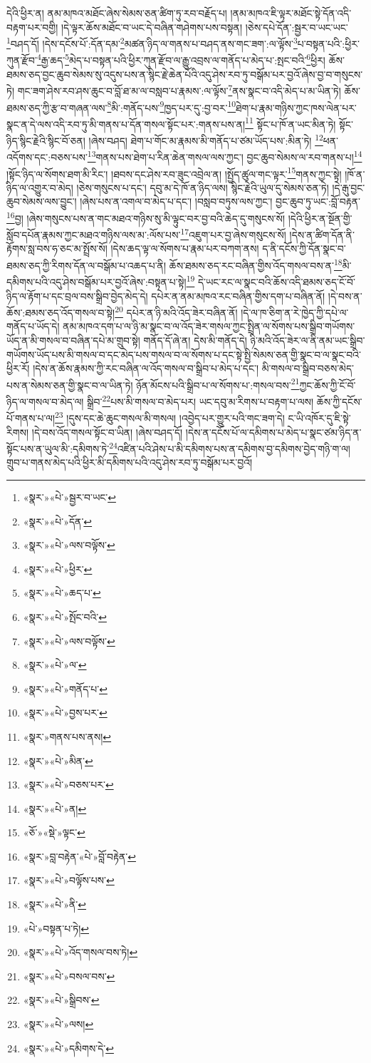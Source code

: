 དེའི་ཕྱིར་ན། ནམ་མཁའ་མཐོང་ཞེས་སེམས་ཅན་ཚིག་ཏུ་རབ་བརྗོད་པ། །ནམ་མཁའ་ཇི་ལྟར་མཐོང་སྟེ་དོན་འདི་བརྟག་པར་བགྱི། །དེ་ལྟར་ཆོས་མཐོང་བ་ཡང་དེ་བཞིན་གཤེགས་པས་བསྟན། །ཅེས་དཔེ་དོན་:སྦྱར་བ་ཡང་ཡང་\footnote{«སྣར་»«པེ་»སྦྱར་བ་ཡང་}བཤད་དོ། །དེས་དངོས་པོ་:དོན་དམ་\footnote{«སྣར་»«པེ་»དོན་}མཚན་ཉིད་ལ་གནས་པ་བཤད་ནས་གང་ཟག་:ལ་ལྟོས་\footnote{«སྣར་»«པེ་»ལས་བལྟོས་}པ་བསྟན་པའི་:ཕྱིར་ཀུན་རྫོབ་\footnote{«སྣར་»«པེ་»ཕྱིར་}རྒྱ་ཆད་\footnote{«སྣར་»«པེ་»ཆད་པ་}མེད་པ་བསྟན་པའི་ཕྱིར་ཀུན་རྫོབ་ལ་རྒྱུ་འབྲས་ལ་གནོད་པ་མེད་པ་:སྤང་བའི་\footnote{«སྣར་»«པེ་»སྤོང་བའི་}ཕྱིར། ཆོས་ཐམས་ཅད་བྱང་ཆུབ་སེམས་སུ་འདུས་པས་ན་སྙིང་རྗེ་ཆེན་པོའི་འདུ་ཤེས་རབ་ཏུ་བསྒོམ་པར་བྱའོ་ཞེས་བྱ་བ་གསུངས་ཏེ། གང་ཟག་ཤེས་རབ་ཤས་ཆུང་བ་བློ་ཐ་མ་ལ་བསླབ་པ་རྣམས་:ལ་ལྟོས་\footnote{«སྣར་»«པེ་»ལས་བལྟོས་}ནས་སྣང་བ་འདི་མེད་པ་མ་ཡིན་ཏེ། ཆོས་ཐམས་ཅད་ཀྱི་རྩ་བ་གཞན་ལས་\footnote{«སྣར་»«པེ་»ལ་}མི་:གནོད་པས་\footnote{«སྣར་»«པེ་»གནོད་པ་}ཁྱད་པར་དུ་:བྱ་བར་\footnote{«སྣར་»«པེ་»བྱས་པར་}ཐེག་པ་རྣམ་གཉིས་ཀྱང་ཁས་ལེན་པར་སྣང་ན་དེ་ལས་འདི་རབ་ཏུ་མི་གནས་པ་དོན་གསལ་སྟོང་པར་:གནས་པས་ན།\footnote{«སྣར་»གནས་པས་ནས།} སྟོང་པ་ཁོ་ན་ཡང་མིན་ཏེ། སྟོང་ཉིད་སྙིང་རྗེའི་སྙིང་བོ་ཅན། །ཞེས་བཤད། ཐེག་པ་གོང་མ་རྣམས་མི་གནོད་པ་ཙམ་ཡོད་པས་:མིན་ཏེ། \footnote{«སྣར་»«པེ་»མིན་}ཕན་འདོགས་དང་:བཅས་པས་\footnote{«སྣར་»«པེ་»བཅས་པར་}གནས་པས་ཐེག་པ་རིན་ཆེན་གསལ་ལས་ཀྱང་། བྱང་ཆུབ་སེམས་ལ་རབ་གནས་པ།\footnote{«སྣར་»«པེ་»ན།} །སྟོང་ཉིད་ལ་སོགས་ཐག་མི་རིང་། །ཐབས་དང་ཤེས་རབ་ཟུང་འབྲེལ་ན། །སྤྱོད་ཚུལ་གང་ལྟར་\footnote{«ཅོ་»«སྡེ་»ལྟང་}གནས་ཀྱང་སྟེ། །ཁོ་ན་ཉིད་ལ་འགྱུར་བ་མེད། །ཅེས་གསུངས་པ་དང་། དབུ་མ་དེ་ཁོ་ན་ཉིད་ལས། སྙིང་རྗེའི་ཡུལ་དུ་སེམས་ཅན་ཏེ། །དེ་རྒུ་བྱང་ཆུབ་སེམས་ལས་བྱུང་། །ཞེས་པས་ན་འགལ་བ་མེད་པ་དང་། །བསླབ་བཏུས་ལས་ཀྱང་། བྱང་ཆུབ་ཏུ་ཡང་:བློ་བརྟན་\footnote{«སྣར་»བླ་བརྟེན་«པེ་»བློ་བརྟེན་}བྱ། །ཞེས་གསུངས་པས་ན་གང་མཐའ་གཉིས་སུ་མི་ལྟུང་བར་བྱ་བའི་ཆེད་དུ་གསུངས་སོ། །དེའི་ཕྱིར་ན་སྔོན་གྱི་སློབ་དཔོན་རྣམས་ཀྱང་མཐའ་གཉིས་ལས་མ་:ལོས་པས་\footnote{«སྣར་»«པེ་»བལྟོས་པས་}འཇུག་པར་བྱ་ཞེས་གསུངས་སོ། །དེས་ན་ཚིག་དོན་ནི་རྟོགས་སླ་བས་ཧ་ཅང་མ་སྤྲོས་སོ། །དེས་ཆད་ལྟ་ལ་སོགས་པ་རྣམ་པར་བཀག་ནས། ད་ནི་དངོས་ཀྱི་དོན་སྣང་བ་ཐམས་ཅད་ཀྱི་རིགས་དོན་ལ་བསྒོམ་པ་འཆད་པ་ནི། ཆོས་ཐམས་ཅད་རང་བཞིན་གྱིས་འོད་གསལ་བས་ན་\footnote{«སྣར་»«པེ་»ནི་}མི་དམིགས་པའི་འདུ་ཤེས་བསྒོམ་པར་བྱའོ་ཞེས་:བསྟན་པ་སྟེ།\footnote{«པེ་»བསྟན་པ་ཏེ།} དེ་ཡང་རང་ལ་སྣང་བའི་ཆོས་འདི་ཐམས་ཅད་ངོ་བོ་ཉིད་ལ་རྟོག་པ་དང་བྲལ་བས་སྒྲིབ་བྱེད་མེད་དེ། དཔེར་ན་ནམ་མཁའ་རང་བཞིན་གྱིས་དག་པ་བཞིན་ནོ། །དེ་བས་ན་ཆོས་:ཐམས་ཅད་འོད་གསལ་བ་སྟེ།\footnote{«སྣར་»«པེ་»འོད་གསལ་བས་ཏེ།} དཔེར་ན་ཉི་མའི་འོད་ཟེར་བཞིན་ནོ། །དེ་ལ་ཁ་ཅིག་ན་རེ་ཁྱེད་ཀྱི་དཔེ་ལ་གནོད་པ་ཡོད་དེ། ནམ་མཁའ་དག་པ་ལ་ཉི་མ་སྣང་བ་ལ་འོད་ཟེར་གསལ་ཀྱང་སྤྲིན་ལ་སོགས་པས་སྒྲིབ་གཡོགས་ཡོད་ན་མི་གསལ་བ་བཞིན་དཔེ་མ་གྲུབ་སྟེ། གནོད་དོ་ཞེ་ན། དེས་མི་གནོད་དེ། ཉི་མའི་འོད་ཟེར་ལ་ནི་ནམ་ཡང་སྒྲིབ་གཡོགས་ཡོད་པས་མི་གསལ་བ་དང་མེད་པས་གསལ་བ་ལ་སོགས་པ་དང་སྟེ་སྤྱི་སེམས་ཅན་གྱི་སྣང་བ་ལ་སྣང་བའི་ཕྱིར་རོ། །དེས་ན་ཆོས་རྣམས་ཀྱི་རང་བཞིན་ལ་འོད་གསལ་བ་སྒྲིབ་པ་མེད་པ་དང་། མི་གསལ་བ་སྒྲིབ་བཅས་མེད་པས་ན་སེམས་ཅན་གྱི་སྣང་བ་ལ་ཡིན་ཏེ། ཉོན་མོངས་པའི་སྒྲིབ་པ་ལ་སོགས་པ་:གསལ་བས་\footnote{«སྣར་»«པེ་»བསལ་བས་}ཀྱང་ཆོས་ཀྱི་ངོ་བོ་ཉིད་ལ་གསལ་བ་མེད་ལ། སྒྲིབ་\footnote{«སྣར་»«པེ་»སྒྲིབས་}པས་མི་གསལ་བ་མེད་པར། ཡང་དབུ་མ་རིགས་པ་བརྟག་པ་ལས། ཆོས་ཀྱི་དངོས་པོ་གནས་པ་ལ།\footnote{«སྣར་»«པེ་»ལས།} །དུས་དང་ཆེ་ཆུང་གསལ་མི་གསལ། །འབྱེད་པར་གྱུར་པའི་གང་ཟག་དེ། ང་ཡི་འཁོར་དུ་ཇི་སྟེ་རིགས། །དེ་བས་འོད་གསལ་སྟོང་བ་ཡིན། །ཞེས་བཤད་དོ། །དེས་ན་དངོས་པོ་ལ་དམིགས་པ་མེད་པ་སྣང་ཙམ་ཉིད་ན་སྟོང་པས་ན་ཡུལ་མི་:དམིགས་ཏེ་\footnote{«སྣར་»«པེ་»དམིགས་དེ་}འཛིན་པའི་ཤེས་པ་མི་དམིགས་པས་ན་དམིགས་བྱ་དམིགས་བྱེད་གཉི་ག་ལ། གྲུབ་པ་གནས་མེད་པའི་ཕྱིར་མི་དམིགས་པའི་འདུ་ཤེས་རབ་ཏུ་བསྒོམ་པར་བྱའོ། 